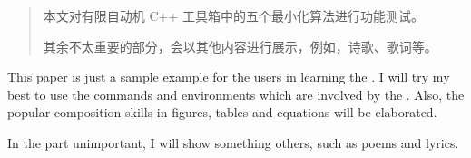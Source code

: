 \begin{abstract}
  本文对有限自动机 C++ 工具箱中的五个最小化算法进行功能测试。
  
  其余不太重要的部分，会以其他内容进行展示，例如，诗歌、歌词等。

\end{abstract}

\begin{enabstract}
  This paper is just a sample example for the users in learning the \XDUthesis. I will try my best to use the commands and environments which are involved by the \XDUthesis. Also, the popular composition skills in figures, tables and equations will be elaborated.
  
  In the part unimportant, I will show something others, such as poems and lyrics.

\end{enabstract}
